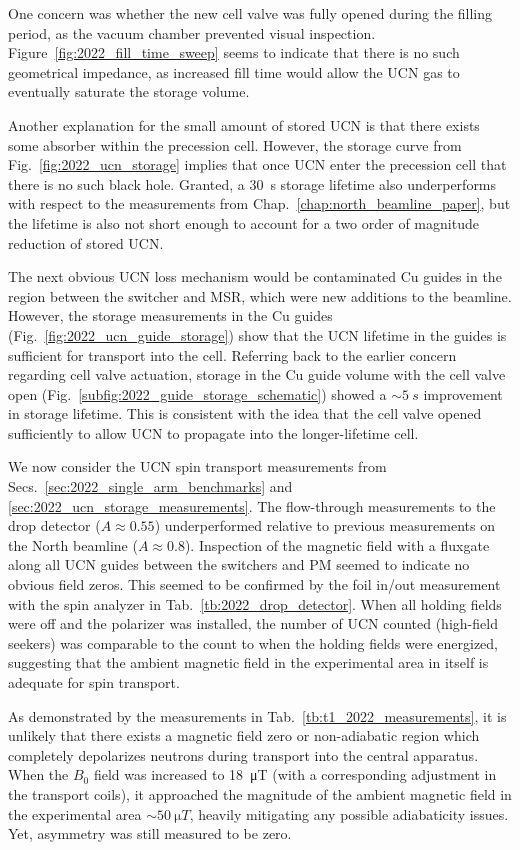 One concern was whether the new cell valve was fully opened during the filling period, as the vacuum chamber prevented visual inspection. Figure~\ref{fig:2022_fill_time_sweep} seems to indicate that there is no such geometrical impedance, as increased fill time would allow the UCN gas to eventually saturate the storage volume.

Another explanation for the small amount of stored UCN is that there exists some absorber within the precession cell. However, the storage curve from Fig.~\ref{fig:2022_ucn_storage} implies that once UCN enter the precession cell that there is no such black hole. Granted, a \qty{30}{s} storage lifetime also underperforms with respect to the measurements from Chap.~\ref{chap:north_beamline_paper}, but the lifetime is also not short enough to account for a two order of magnitude reduction of stored UCN.

The next obvious UCN loss mechanism would be contaminated Cu guides in the region between the switcher and MSR, which were new additions to the beamline. However, the storage measurements in the Cu guides  (Fig.~\ref{fig:2022_ucn_guide_storage}) show that the UCN lifetime in the guides is sufficient for transport into the cell. Referring back to the earlier concern regarding cell valve actuation, storage in the Cu guide volume with the cell valve open (Fig.~\ref{subfig:2022_guide_storage_schematic}) showed a $\sim \qty{5}{s}$ improvement in storage lifetime. This is consistent with the idea that the cell valve opened sufficiently to allow UCN to propagate into the longer-lifetime cell.

We now consider the UCN spin transport measurements from Secs.~\ref{sec:2022_single_arm_benchmarks} and \ref{sec:2022_ucn_storage_measurements}. The flow-through measurements to the drop detector ($A\approx 0.55$) underperformed relative to previous measurements on the North beamline  ($A\approx 0.8$). Inspection of the magnetic field with a fluxgate along all UCN guides between the switchers and PM seemed to indicate no obvious field zeros. This seemed to be confirmed by the foil in/out measurement with the spin analyzer in Tab.~\ref{tb:2022_drop_detector}. When all holding fields were off and the polarizer was installed, the number of UCN counted (high-field seekers) was comparable to the count to when the holding fields were energized, suggesting that the ambient magnetic field in the experimental area in itself is adequate for spin transport.

As demonstrated by the measurements in Tab.~\ref{tb:t1_2022_measurements}, it is unlikely that there exists a magnetic field zero or non-adiabatic region which completely depolarizes neutrons during transport into the central apparatus. When the $B_0$ field was increased to \qty{18}{\micro T} (with a corresponding adjustment in the transport coils), it approached the magnitude of the ambient magnetic field in the experimental area $\sim\qty{50}{\micro T}$, heavily mitigating any possible adiabaticity issues. Yet, asymmetry was still measured to be zero.

